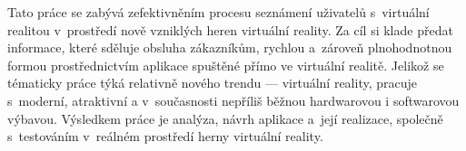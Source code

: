 Tato práce se zabývá zefektivněním procesu seznámení uživatelů
s~virtuální realitou v~prostředí nově vzniklých heren virtuální reality.
Za cíl si klade předat informace, které sděluje obsluha zákazníkům,
rychlou a~zároveň plnohodnotnou formou prostřednictvím aplikace spuštěné
přímo ve virtuální realitě. Jelikož se tématicky práce týká relativně
nového trendu --- virtuální reality, pracuje s~moderní, atraktivní a
v~současnosti nepříliš běžnou hardwarovou i softwarovou výbavou. Výsledkem
práce je analýza, návrh aplikace a~její realizace, společně s~testováním
v~reálném prostředí herny virtuální reality.
